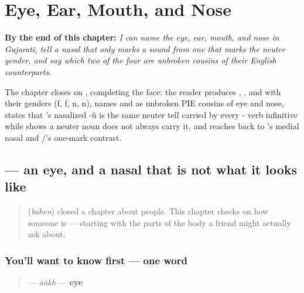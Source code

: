 
\chapter{Eye, Ear, Mouth, and Nose}
\label{ch:gu-face-parts}

\begin{chapteropening}
\textbf{By the end of this chapter:} \emph{I can name the eye, ear, mouth, and nose in Gujarati, tell a nasal that only marks a sound from one that marks the neuter gender, and say which two of the four are unbroken cousins of their English counterparts.}

The chapter closes on , completing the face: the reader produces , ,  and  with their genders (f, f, n, n), names  and  as unbroken PIE cousins of eye and nose, states that 's nasalized -ũ is the same neuter tell carried by every - verb infinitive while  shows a neuter noun does not always carry it, and reaches back to 's medial nasal and /'s one-mark contrast.
\end{chapteropening}

\section[\texorpdfstring{\gu{આંખ} (āṅkh)}{આંખ (āṅkh)}]{ — an eye, and a nasal that is not what it looks like}

\label{lesson:GU-C12-aankh}



\begin{quote}
\textbf{} (\emph{bahen}) closed a chapter about people. This chapter checks on how someone is — starting with the parts of the body a friend might actually ask about.
\end{quote}

\subsection*{You'll want to know first — one word}
\begin{quote}
\textbf{} — \emph{āṅkh} — \textbf{eye}
\end{quote}

